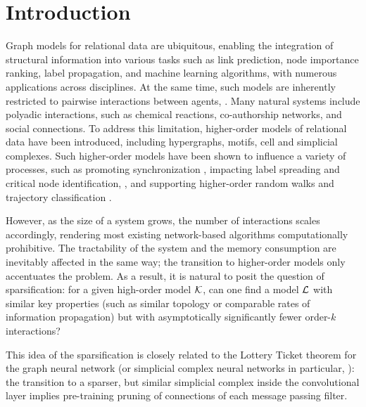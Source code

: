 \section{Introduction}

Graph models for relational data are ubiquitous, enabling the integration of structural information into various tasks such as link prediction, node importance ranking, label propagation, and machine learning algorithms, with numerous applications across disciplines. At the same time, such models are inherently restricted to pairwise interactions between agents, \cite{benson2016higher,battiston2020networks}. Many natural systems include polyadic interactions, such as chemical reactions, co-authorship networks, and social connections. To address this limitation, higher-order models of relational data have been introduced, including hypergraphs, motifs, cell and simplicial complexes. Such higher-order models have been shown to influence a variety of processes, such as promoting synchronization \cite{gambuzza2021stability}, impacting label spreading and critical node identification, \cite{tudisco2021nonlinear,prokopchik2022nonlinear}, and supporting higher-order random walks and trajectory classification \cite{schaub2019random}.

However, as the size of a system grows, the number of interactions scales accordingly, rendering most existing network-based algorithms computationally prohibitive. The tractability of the system and the memory consumption are inevitably affected in the same way; the transition to higher-order models only accentuates the problem. As a result, it is natural to posit the question of sparsification: for a given high-order model \( \mathcal{K} \), can one find a model \( \mathcal{L} \) with similar key properties (such as similar topology or comparable rates of information propagation) but with asymptotically significantly fewer order-\( k\) interactions?

This idea of the sparsification is closely related to the Lottery Ticket theorem for the graph neural network (or simplicial complex neural networks in particular, \cite{ebli2020simplicial, yang2022simplicial}): the transition to a sparser, but similar simplicial complex inside the convolutional layer implies pre-training pruning of connections of each message passing filter.

